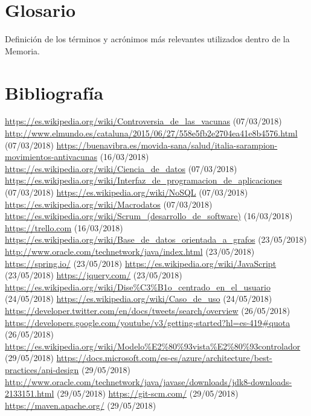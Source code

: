 \documentclass[11pt,a4paper]{article}
\begin{document}
\section{Glosario}
\bigskip

Definición de los términos y acrónimos más relevantes utilizados dentro de la Memoria. 
\newpage 


\section{Bibliografía}
\bigskip

\begin{thebibliography}{0}
   \url{https://es.wikipedia.org/wiki/Controversia_de_las_vacunas} (07/03/2018)
   \url{http://www.elmundo.es/cataluna/2015/06/27/558e5fb2e2704ea41e8b4576.html} (07/03/2018)
   \url{https://buenavibra.es/movida-sana/salud/italia-sarampion-movimientos-antivacunas} (16/03/2018)
   \url{https://es.wikipedia.org/wiki/Ciencia_de_datos} (07/03/2018)
   \url{https://es.wikipedia.org/wiki/Interfaz_de_programacion_de_aplicaciones} (07/03/2018)
   \url{https://es.wikipedia.org/wiki/NoSQL} (07/03/2018)
   \url{https://es.wikipedia.org/wiki/Macrodatos} (07/03/2018)
   \url{https://es.wikipedia.org/wiki/Scrum_(desarrollo_de_software)} (16/03/2018)
   \url{https://trello.com} (16/03/2018)
   \url{https://es.wikipedia.org/wiki/Base_de_datos_orientada_a_grafos} (23/05/2018)
   \url{http://www.oracle.com/technetwork/java/index.html} (23/05/2018)
   \url{https://spring.io/} (23/05/2018)
   \url{https://es.wikipedia.org/wiki/JavaScript} (23/05/2018)
   \url{https://jquery.com/} (23/05/2018)
   \url{https://es.wikipedia.org/wiki/Dise%C3%B1o_centrado_en_el_usuario} (24/05/2018)
   \url{https://es.wikipedia.org/wiki/Caso_de_uso} (24/05/2018) 
   \url{https://developer.twitter.com/en/docs/tweets/search/overview} (26/05/2018) 
   \url{https://developers.google.com/youtube/v3/getting-started?hl=es-419#quota} (26/05/2018) 
   \url{https://es.wikipedia.org/wiki/Modelo%E2%80%93vista%E2%80%93controlador} (29/05/2018) 
   \url{https://docs.microsoft.com/es-es/azure/architecture/best-practices/api-design} (29/05/2018) 
   \url{http://www.oracle.com/technetwork/java/javase/downloads/jdk8-downloads-2133151.html} (29/05/2018) 
   \url{https://git-scm.com/} (29/05/2018) 
   \url{https://maven.apache.org/} (29/05/2018) 

\end{thebibliography}
\end{document}
